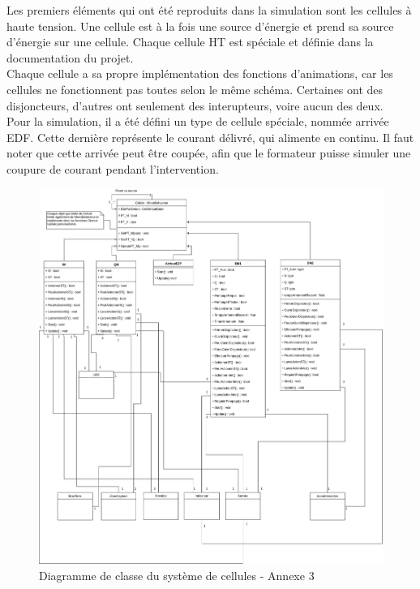 \documentclass[a4paper]{article}
\begin{document}
    Les premiers éléments qui ont été reproduits dans la simulation sont les cellules à haute tension. Une cellule est à la fois une source d'énergie et prend sa source d'énergie sur une cellule. Chaque cellule HT est spéciale et définie dans la documentation du projet. \\

    Chaque cellule a sa propre implémentation des fonctions d'animations, car les cellules ne fonctionnent pas toutes selon le même schéma. Certaines ont des disjoncteurs, d'autres ont seulement des interupteurs, voire aucun des deux. \\

    Pour la simulation, il a été défini un type de cellule spéciale, nommée arrivée EDF. Cette dernière représente le courant délivré, qui alimente en continu. Il faut noter que cette arrivée peut être coupée, afin que le formateur puisse simuler une coupure de courant pendant l'intervention. \\

    \begin{figure}[H]
        \centering
        \includegraphics[scale=0.35]{img/DiagClassCellules}
        \caption{Diagramme de classe du système de cellules - Annexe 3}
    \end{figure}
\end{document}
